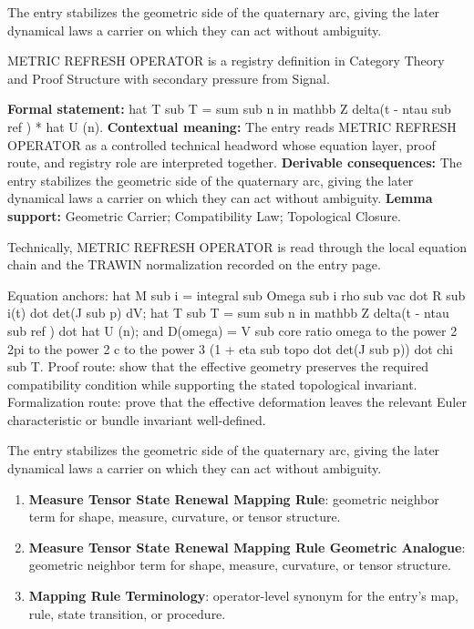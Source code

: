 The entry stabilizes the geometric side of the quaternary arc, giving the later dynamical laws a carrier on which they can act without ambiguity.
\clearpage


\begingroup\small
{}
METRIC REFRESH OPERATOR is a registry definition in Category Theory and Proof Structure with secondary pressure from Signal.

\begingroup\footnotesize\setlength{\emergencystretch}{3em}\sloppy
\textbf{Formal statement:} hat T sub T = sum sub n in mathbb Z delta(t - ntau sub ref ) * hat U (n). \textbf{Contextual meaning:} The entry reads METRIC REFRESH OPERATOR as a controlled technical headword whose equation layer, proof route, and registry role are interpreted together. \textbf{Derivable consequences:} The entry stabilizes the geometric side of the quaternary arc, giving the later dynamical laws a carrier on which they can act without ambiguity. \textbf{Lemma support:} Geometric Carrier; Compatibility Law; Topological Closure.\par
\endgroup

Technically, METRIC REFRESH OPERATOR is read through the local equation chain and the TRAWIN normalization recorded on the entry page.

Equation anchors: hat M sub i = integral sub Omega sub i rho sub vac dot R sub i(t) dot det(J sub p) dV; hat T sub T = sum sub n in mathbb Z delta(t - ntau sub ref ) dot hat U (n); and D(omega) = V sub core ratio omega to the power 2 2pi to the power 2 c to the power 3 (1 + eta sub topo dot det(J sub p)) dot chi sub T. Proof route: show that the effective geometry preserves the required compatibility condition while supporting the stated topological invariant. Formalization route: prove that the effective deformation leaves the relevant Euler characteristic or bundle invariant well-defined.

The entry stabilizes the geometric side of the quaternary arc, giving the later dynamical laws a carrier on which they can act without ambiguity.
\endgroup

\begin{enumerate}[leftmargin=1.6em,itemsep=6pt,topsep=4pt]
\item \textbf{Measure Tensor State Renewal Mapping Rule}: geometric neighbor term for shape, measure, curvature, or tensor structure.
\item \textbf{Measure Tensor State Renewal Mapping Rule Geometric Analogue}: geometric neighbor term for shape, measure, curvature, or tensor structure.
\item \textbf{Mapping Rule Terminology}: operator-level synonym for the entry's map, rule, state transition, or procedure.
\end{enumerate}

